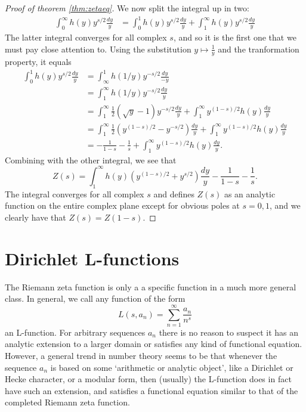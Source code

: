 \documentclass{amsart}
\begin{document}
\begin{proof}[Proof of theorem \ref{thm:zetaeq}]
  We now split the integral up in two:
  \begin{align*}
    \int_0^\infty h(y) y^{s/2} \frac{dy}{y} &= \int_0^1  h(y) y^{s/2} \frac{dy}{y} + \int_1^\infty  h(y) y^{s/2} \frac{dy}{y}
  \end{align*}
  The latter integral converges for all complex $s$, and so it is the first one that we must pay close attention to. Using the substitution $y\mapsto \frac{1}{y}$ and the tranformation property, it equals
  \begin{align*}
    \int_0^1  h(y) y^{s/2} \frac{dy}{y} &=  \int_\infty^1  h(1/y) y^{-s/2} \frac{dy}{-y} \\
                                        &= \int_1^\infty h(1/y) y^{-s/2} \frac{dy}{y} \\
                                        &= \int_1^\infty  \frac{1}{2}(\sqrt{y} - 1)y^{-s/2} \frac{dy}{y} +\int_1^\infty  y^{(1-s)/2}h(y) \frac{dy}{y} \\
                                        &= \int_1^\infty  \frac{1}{2}(y^{(1-s)/2} - y^{-s/2}) \frac{dy}{y} +\int_1^\infty  y^{(1-s)/2}h(y) \frac{dy}{y} \\
    &= -\frac{1}{1-s} -\frac{1}{s} + \int_1^\infty  y^{(1-s)/2}h(y) \frac{dy}{y}.
  \end{align*}
  Combining with the other integral, we see that
  \[Z(s) = \int_1^\infty h(y) \left( y^{(1-s)/2} + y^{s/2}  \right)\frac{dy}{y} - \frac{1}{1-s} - \frac{1}{s}. \]
  The integral converges for all complex $s$ and defines $Z(s)$ as an analytic function on the entire complex plane except for obvious poles at $s=0,1$, and we clearly have that $Z(s) = Z(1-s)$.
\end{proof}

\section{Dirichlet L-functions}
The Riemann zeta function is only a a specific function in a much more general class. In general, we call any function of the form
\[L(s, a_n) = \sum_{n=1}^\infty \frac{a_n}{n^s} \]
an L-function. For arbitrary sequences $a_n$ there is no reason to suspect it has an analytic extension to a larger domain or satisfies any kind of functional equation. However, a general trend in number theory seems to be that whenever the sequence $a_n$ is based on some `arithmetic or analytic object', like a Dirichlet or Hecke character, or a modular form, then (usually) the L-function does in fact have such an extension, and satisfies a functional equation similar to that of the completed Riemann zeta function.
\end{document}
